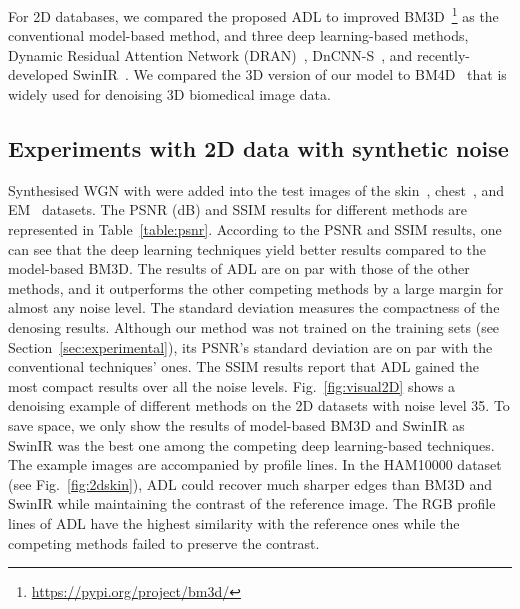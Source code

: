 \documentclass[journal,twoside,web]{ieeecolor}
\begin{document}
\begin{figure*}
    \centering
\caption{Color and gray-scale image denoising results
on a) skin, b) chest, and c) EM images with noise level 35. From left to right: Reference, noisy, BM3D, SwinIR, and the proposed ADL.}
\label{fig:visual2D}
\end{figure*}For 2D databases, we compared the proposed ADL to improved BM3D~\cite{makinen2020collaborative}\footnote{\url{https://pypi.org/project/bm3d/}} as the conventional model-based method, and three deep learning-based methods, Dynamic Residual Attention Network (DRAN)~\cite{sharif2020learning}, DnCNN-S~\cite{zhang2017beyond}, and recently-developed SwinIR~\cite{liang2021swinir}. We compared the 3D version of our model to BM4D~\cite{maggioni2012nonlocal} that is widely used for denoising 3D biomedical image data.

\subsection{Experiments with 2D data with synthetic noise}
Synthesised WGN with  were added into the test images of the skin~\cite{DBW86T_2018}, chest~\cite{kermany2018identifying}, and EM~\cite{isbi2021} datasets. The PSNR (dB) and SSIM results for different methods are represented in Table~\ref{table:psnr}.
According to the PSNR and SSIM results, one can see that the deep learning techniques yield better results compared to the model-based BM3D. The results of ADL are on par with those of the other methods, and it outperforms the other competing methods by a large margin for almost any noise level.
The standard deviation measures the compactness of the denosing results.
Although our method was not trained on the training sets (see Section~\ref{sec:experimental}), its PSNR's standard deviation are on par with the conventional techniques' ones. The SSIM results report that ADL gained the most compact results over all the noise levels. 
Fig.~\ref{fig:visual2D} shows a denoising example of different methods on the 2D datasets with noise level 35. To save space, we only show the results of model-based BM3D and SwinIR as SwinIR was the best one among the competing deep learning-based techniques. The example images are accompanied by profile lines.
In the HAM10000 dataset (see Fig.~\ref{fig:2dskin}),  ADL could recover much sharper edges than BM3D and SwinIR while maintaining the contrast of the reference image. The RGB profile lines of ADL have the highest similarity with the reference ones while the competing methods failed to preserve the contrast.
\end{document}
